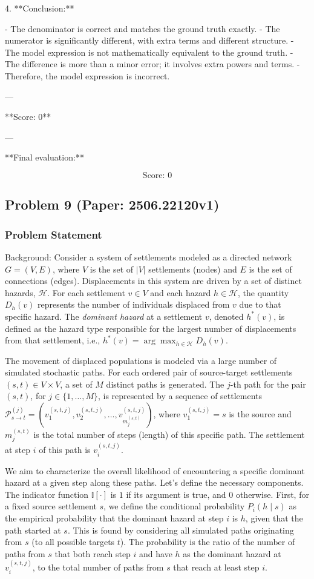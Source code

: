 \documentclass[10pt]{article}
\begin{document}
4. **Conclusion:**

   - The denominator is correct and matches the ground truth exactly.
   - The numerator is significantly different, with extra terms and different structure.
   - The model expression is not mathematically equivalent to the ground truth.
   - The difference is more than a minor error; it involves extra powers and terms.
   - Therefore, the model expression is incorrect.

---

**Score: 0**

---

**Final evaluation:**

\[
\boxed{
\text{Score: } 0
}
\]

\newpage
\subsection*{Problem 9 (Paper: 2506.22120v1)}
\subsubsection*{Problem Statement}
Background:
Consider a system of settlements modeled as a directed network $G=(V,E)$, where $V$ is the set of $|V|$ settlements (nodes) and $E$ is the set of connections (edges). Displacements in this system are driven by a set of distinct hazards, $\mathcal{H}$. For each settlement $v \in V$ and each hazard $h \in \mathcal{H}$, the quantity $D_h(v)$ represents the number of individuals displaced from $v$ due to that specific hazard. The \emph{dominant hazard} at a settlement $v$, denoted $h^*(v)$, is defined as the hazard type responsible for the largest number of displacements from that settlement, i.e., $h^*(v) = \arg\max_{h \in \mathcal{H}} D_h(v)$.

The movement of displaced populations is modeled via a large number of simulated stochastic paths. For each ordered pair of source-target settlements $(s, t) \in V \times V$, a set of $M$ distinct paths is generated. The $j$-th path for the pair $(s, t)$, for $j \in \{1, \dots, M\}$, is represented by a sequence of settlements $\mathcal{P}^{(j)}_{s \to t} = (v_1^{(s,t,j)}, v_2^{(s,t,j)}, \dots, v_{m_j^{(s,t)}}^{(s,t,j)})$, where $v_1^{(s,t,j)} = s$ is the source and $m_j^{(s,t)}$ is the total number of steps (length) of this specific path. The settlement at step $i$ of this path is $v_i^{(s,t,j)}$.

We aim to characterize the overall likelihood of encountering a specific dominant hazard at a given step along these paths. Let's define the necessary components. The indicator function $\mathbb{I}[\cdot]$ is $1$ if its argument is true, and $0$ otherwise. First, for a fixed source settlement $s$, we define the conditional probability $P_i(h \mid s)$ as the empirical probability that the dominant hazard at step $i$ is $h$, given that the path started at $s$. This is found by considering all simulated paths originating from $s$ (to all possible targets $t$). The probability is the ratio of the number of paths from $s$ that both reach step $i$ and have $h$ as the dominant hazard at $v_i^{(s,t,j)}$, to the total number of paths from $s$ that reach at least step $i$.
\end{document}
